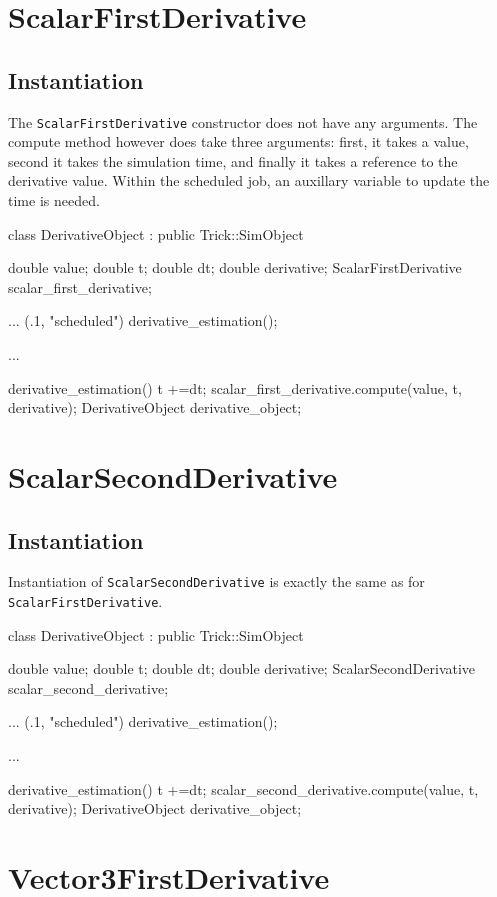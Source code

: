 \documentclass{report}
\begin{document}
\section{ScalarFirstDerivative}
\subsection{Instantiation}
The \verb|ScalarFirstDerivative| constructor does not have any arguments. The compute method however does take three arguments: first, it takes a value, second it takes the simulation time, and finally it takes a reference to the derivative value. Within the scheduled job, an auxillary variable to update the time is needed.

\begin{code}
class DerivativeObject : public Trick::SimObject{
    double value;
    double t; 
    double dt;
    double derivative;
    ScalarFirstDerivative scalar_first_derivative;

    ...
        (.1, "scheduled") derivative_estimation();
    
    ...

    derivative_estimation(){
        t +=dt;
        scalar_first_derivative.compute(value, t, derivative);
    }
    DerivativeObject derivative_object;
}
\end{code}

\section{ScalarSecondDerivative}
\subsection{Instantiation}
Instantiation of \verb|ScalarSecondDerivative| is exactly the same as for \verb|ScalarFirstDerivative|.

\begin{code}
class DerivativeObject : public Trick::SimObject{
    double value;
    double t; 
    double dt;
    double derivative;
    ScalarSecondDerivative scalar_second_derivative;

    ...
        (.1, "scheduled") derivative_estimation();
    
    ...

    derivative_estimation(){
        t +=dt;
        scalar_second_derivative.compute(value, t, derivative);
    }
    DerivativeObject derivative_object;
}
\end{code}
\section{Vector3FirstDerivative}
\end{document}
